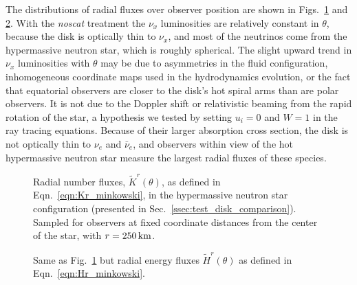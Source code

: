 \documentclass[aps,floatfix,prd,superscriptaddress,twocolumn]{revtex4-1}
\begin{document}
The distributions of radial fluxes over observer position are shown
in Figs.~\ref{fig:nsns_theta_distrib_Kr} and \ref{fig:nsns_theta_distrib_Hr}.
With the \emph{noscat} treatment the $\nu_x$ luminosities are relatively
constant in $\theta$, because the disk is optically thin to $\nu_x$,
and most of the neutrinos come from the hypermassive neutron star,
which is roughly spherical.
The slight upward trend in $\nu_x$ luminosities with $\theta$ may be due to
asymmetries in the fluid configuration,
inhomogeneous coordinate maps used in the hydrodynamics evolution,
or the fact that equatorial observers are closer to the disk's hot spiral arms
than are polar observers.
It is not due to the Doppler shift or relativistic beaming
from the rapid rotation of the star,
a hypothesis we tested by setting $u_i=0$ and $W=1$ in the ray
tracing equations.
Because of their larger absorption cross section,
the disk is not optically thin to $\nu_e$ and $\bar{\nu}_e$,
and observers within view of the hot hypermassive neutron star measure
the largest radial fluxes of these species.

\begin{figure}
  \resizebox{\columnwidth}{!}{}
  \caption{Radial number fluxes, $\tilde{K}^r(\theta)$,
    as defined in Eqn.~\ref{eqn:Kr_minkowski},
    in the hypermassive neutron star configuration
    (presented in Sec.~\ref{ssec:test_disk_comparison}).
    Sampled for observers at fixed coordinate distances from the center
    of the star, with $r=250\,{\rm km}$.
  }
  \label{fig:nsns_theta_distrib_Kr}
\end{figure}

\begin{figure}
  \resizebox{\columnwidth}{!}{}
  \caption{Same as Fig.~\ref{fig:nsns_theta_distrib_Kr} but radial energy
    fluxes $\tilde{H}^r(\theta)$ as defined in Eqn.~\ref{eqn:Hr_minkowski}.
  }
  \label{fig:nsns_theta_distrib_Hr}
\end{figure}
\end{document}
